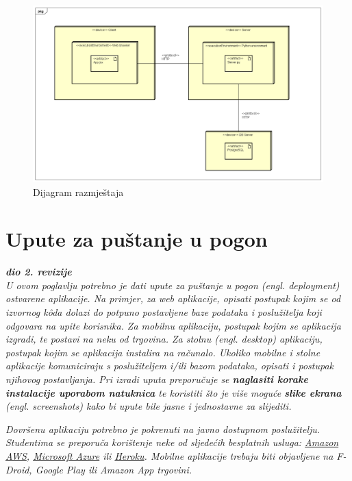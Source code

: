 		\begin{figure}[htp]
			\includegraphics[scale=0.4]{dijagrami/DeploymentDiagram0.png}
			\centering
			\caption{Dijagram razmještaja}
		\end{figure}
		
		\section{Upute za puštanje u pogon}
		
			\textbf{\textit{dio 2. revizije}}\\
		
			 \textit{U ovom poglavlju potrebno je dati upute za puštanje u pogon (engl. deployment) ostvarene aplikacije. Na primjer, za web aplikacije, opisati postupak kojim se od izvornog kôda dolazi do potpuno postavljene baze podataka i poslužitelja koji odgovara na upite korisnika. Za mobilnu aplikaciju, postupak kojim se aplikacija izgradi, te postavi na neku od trgovina. Za stolnu (engl. desktop) aplikaciju, postupak kojim se aplikacija instalira na računalo. Ukoliko mobilne i stolne aplikacije komuniciraju s poslužiteljem i/ili bazom podataka, opisati i postupak njihovog postavljanja. Pri izradi uputa preporučuje se \textbf{naglasiti korake instalacije uporabom natuknica} te koristiti što je više moguće \textbf{slike ekrana} (engl. screenshots) kako bi upute bile jasne i jednostavne za slijediti.}
			
			
			 \textit{Dovršenu aplikaciju potrebno je pokrenuti na javno dostupnom poslužitelju. Studentima se preporuča korištenje neke od sljedećih besplatnih usluga: \href{https://aws.amazon.com/}{Amazon AWS}, \href{https://azure.microsoft.com/en-us/}{Microsoft Azure} ili \href{https://www.heroku.com/}{Heroku}. Mobilne aplikacije trebaju biti objavljene na F-Droid, Google Play ili Amazon App trgovini.}
			
			
			\eject 